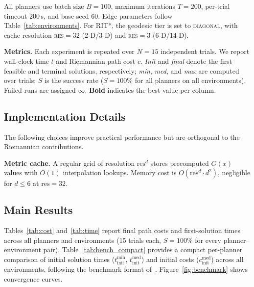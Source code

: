 \documentclass[journal]{IEEEtran}
\begin{document}
All planners use batch size $B=100$, maximum iterations
$T=200$, per-trial timeout 200\,s, and base seed 60.
Edge parameters follow Table~\ref{tab:environments}.
For RIT*, the geodesic tier is set to \textsc{diagonal},
with cache resolution \textsc{res}$=32$ (2-D/3-D) and
\textsc{res}$=3$ (6-D/14-D).

\textbf{Metrics.}
Each experiment is repeated over $N=15$ independent trials.
We report wall-clock time $t$ and Riemannian path cost $c$.
\emph{Init} and \emph{final} denote the first feasible and
terminal solutions, respectively; \emph{min}, \emph{med},
and \emph{max} are computed over trials; $S$ is the success
rate ($S=100\%$ for all planners on all environments).
Failed runs are assigned $\infty$.
\textbf{Bold} indicates the best value per column.

\subsection{Implementation Details}\label{sec:impl}

The following choices improve practical performance but are orthogonal
to the Riemannian contributions.

\textbf{Metric cache.}
A regular grid of resolution $\mathrm{res}^d$ stores precomputed
$G(x)$ values with $O(1)$ interpolation lookups.
Memory cost is $O(\mathrm{res}^d \cdot d^2)$, negligible for
$d \le 6$ at $\mathrm{res} = 32$.

\subsection{Main Results}\label{sec:results}

Tables~\ref{tab:cost} and~\ref{tab:time} report final path costs and
first-solution times across all planners and environments (15 trials
each, $S=100\%$ for every planner--environment pair).
Table~\ref{tab:bench_compact} provides a compact per-planner comparison
of initial solution times ($t^{\min}_{\mathrm{init}}$,
$t^{\mathrm{med}}_{\mathrm{init}}$) and initial costs
($c^{\mathrm{med}}_{\mathrm{init}}$) across all environments,
following the benchmark format of~\cite{APT2025}.
Figure~\ref{fig:benchmark} shows convergence curves.
\end{document}
